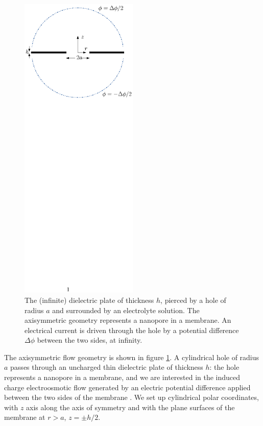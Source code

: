 \begin{figure}[h]
\begin{center}
\includegraphics[width=0.5\textwidth,clip=true]{eddies/eddy_fig1b.eps}
\end{center}
\caption{The (infinite)
dielectric plate of thickness $h$, pierced by a hole of radius $a$
and surrounded by
an electrolyte solution. 
The axisymmetric geometry represents a nanopore in a membrane.
An electrical current is driven through the hole by a potential difference
$\Delta\phi$ between the two sides, at infinity.}
\label{fig:hole}
\end{figure}


The axisymmetric flow geometry is shown in figure \ref{fig:hole}.
A cylindrical
hole of radius $a$ passes through an uncharged thin dielectric
plate of thickness $h$:
the hole represents a nanopore in a membrane, and we are interested in the
induced charge electroosmotic
flow generated by an electric potential difference applied 
between the two sides of the membrane \cite{Mao2013,mao2014,sherwood2014}.
We set up cylindrical polar coordinates, with $z$ axis along the axis of
symmetry and with the plane surfaces of the membrane at $r>a$,  $z=\pm h/2$.

